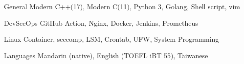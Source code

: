

\begin{cvskills}

    \cvskill
    {General} %
    {Modern C++(17), Modern C(11), Python 3, Golang, Shell script, vim} %

    \cvskill
    {DevSecOps} %
    {GitHub Action, Nginx, Docker, Jenkins, Prometheus} %


    \cvskill
    {Linux} %
    {Container, seccomp, LSM, Crontab, UFW, System Programming} %

    \cvskill
    {Languages} %
    {Mandarin (native), English (TOEFL iBT 55), Taiwanese} %

\end{cvskills}
